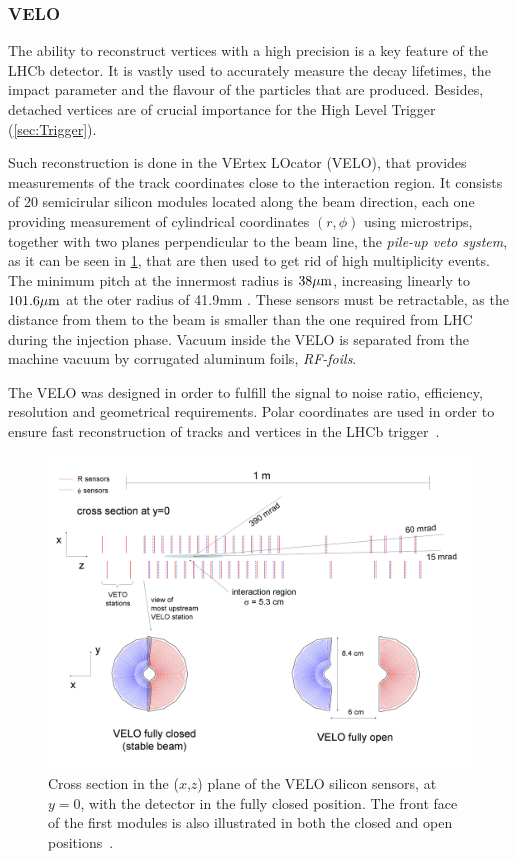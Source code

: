 \subsubsection{VELO} 
The ability to reconstruct vertices with a high precision is a key feature of the LHCb detector. It is vastly used to accurately measure the decay lifetimes, the impact parameter and the flavour of the particles that are produced. Besides, detached vertices are of crucial importance for the High Level Trigger (\ref{sec:Trigger}). 

Such reconstruction is done in the VErtex LOcator (VELO), that provides measurements of the track coordinates close to the interaction region. It consists of 20 semicirular silicon modules located along the beam direction, each one providing measurement of cylindrical coordinates $(r,\phi)$ using microstrips, together with two planes perpendicular to the beam line, the \textit{pile-up veto system}, as it can be seen in \ref{fig:velo}, that are then used to get rid of high multiplicity events. The minimum pitch at the innermost radius
is $38  \rm \mu m$, increasing linearly to $101.6  \rm \mu m$ at the oter radius of 41.9mm . 
These sensors must be retractable, as the distance from them to the beam is smaller than the one required from LHC during the injection phase.  Vacuum inside the VELO is separated from the machine vacuum by corrugated aluminum foils, \textit{RF-foils}. 

The VELO was designed in order to fulfill the signal to noise ratio, efficiency, resolution and geometrical requirements. Polar coordinates are used in order to ensure fast reconstruction of tracks and vertices in the LHCb trigger~\cite{Alves:2008zz}.

\begin{figure} [htb!]
\begin{center}
\includegraphics[scale=0.18]{figs/velo.png}
\caption{Cross section in the ($x$,$z$) plane of the VELO silicon sensors, at $y=0$, with the detector in the fully closed position. The front face of the first modules is also illustrated in both the closed and open positions~\cite{Alves:2008zz}.\label{fig:velo}}
\end{center}
\end{figure}

